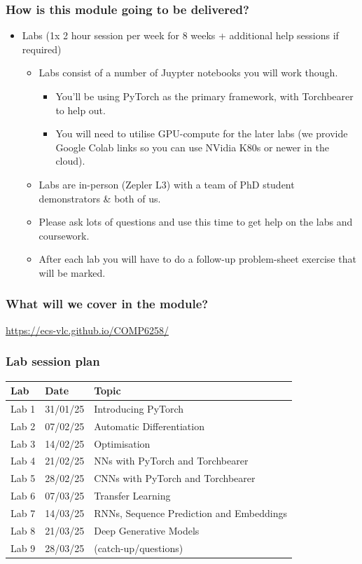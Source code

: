 \documentclass[]{article}
\begin{document}
\begin{frame}
	\frametitle{How is this module going to be delivered?}

	\begin{itemize}
		\item<+-> Labs (1x 2 hour session per week for 8 weeks + additional help sessions if required)
		\begin{itemize}
			\item Labs consist of a number of Juypter notebooks you will work though.
			\begin{itemize}
				\item You'll be using PyTorch as the primary framework, with Torchbearer to help out.
				\item You will need to utilise GPU-compute for the later labs (we provide Google Colab links so you can use NVidia K80s or newer in the cloud).
			\end{itemize}
			\item Labs are in-person (Zepler L3) with a team of PhD student demonstrators \& both of us.
			\item Please ask lots of questions and use this time to get help on the labs and coursework.
			\item After each lab you will have to do a follow-up problem-sheet exercise that will be marked.
		\end{itemize}
	\end{itemize}
\end{frame}

\begin{frame}
	\frametitle{What will we cover in the module?}
	\url{https://ecs-vlc.github.io/COMP6258/}
\end{frame}

\begin{frame}
	\frametitle{Lab session plan}

	\begin{center}
	\begin{tabular}{ l l l }
		 Lab & Date & Topic \\ \hline
		 Lab 1  & 31/01/25 & Introducing PyTorch \\
		 Lab 2  & 07/02/25 & Automatic Differentiation \\
		 Lab 3  & 14/02/25 & Optimisation \\
		 Lab 4  & 21/02/25 & NNs with PyTorch and Torchbearer \\
 		 Lab 5  & 28/02/25 & CNNs with PyTorch and Torchbearer \\
 		 Lab 6  & 07/03/25 & Transfer Learning \\
 		 Lab 7  & 14/03/25 & RNNs, Sequence Prediction and Embeddings \\
     Lab 8  & 21/03/25 & Deep Generative Models\\
     Lab 9  & 28/03/25 & (catch-up/questions)\\
	\end{tabular}
	\end{center}
\end{frame}
\end{document}
